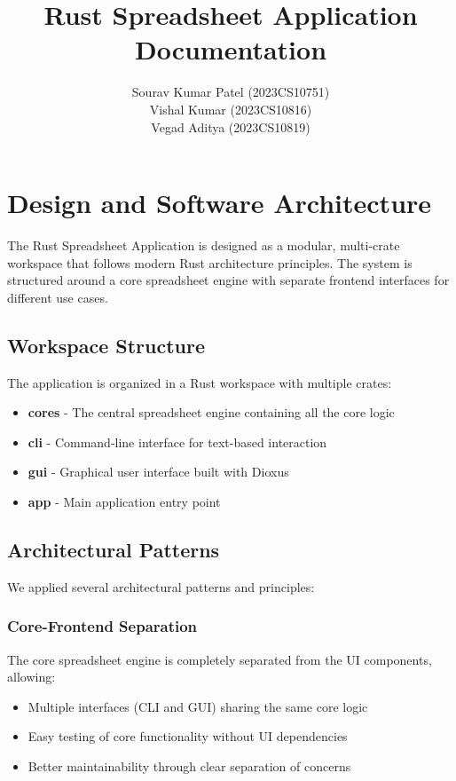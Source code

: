 \documentclass[12pt]{article}
\title{\textbf{Rust Spreadsheet Application Documentation}}
\author{Sourav Kumar Patel (2023CS10751) \\ Vishal Kumar (2023CS10816) \\ Vegad Aditya (2023CS10819)}
\begin{document}
\maketitle

\section{Design and Software Architecture}
The Rust Spreadsheet Application is designed as a modular, multi-crate workspace that follows modern Rust architecture principles. The system is structured around a core spreadsheet engine with separate frontend interfaces for different use cases.

\subsection{Workspace Structure}
The application is organized in a Rust workspace with multiple crates:
\begin{itemize}
    \item \textbf{cores} - The central spreadsheet engine containing all the core logic
    \item \textbf{cli} - Command-line interface for text-based interaction
    \item \textbf{gui} - Graphical user interface built with Dioxus
    \item \textbf{app} - Main application entry point
\end{itemize}

\subsection{Architectural Patterns}
We applied several architectural patterns and principles:

\subsubsection{Core-Frontend Separation}
The core spreadsheet engine is completely separated from the UI components, allowing:
\begin{itemize}
    \item Multiple interfaces (CLI and GUI) sharing the same core logic
    \item Easy testing of core functionality without UI dependencies
    \item Better maintainability through clear separation of concerns
\end{itemize}
\end{document}
